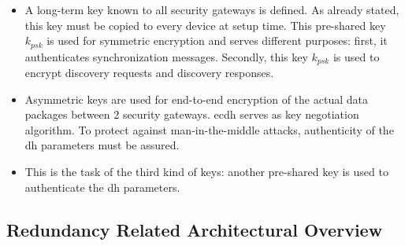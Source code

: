 \begin{itemize}
 \item A long-term key known to all security gateways is defined. As already stated, this key must be copied to every device at setup time. 
This pre-shared key $k_{psk}$ is used for symmetric encryption and serves different purposes: first, it authenticates synchronization messages.
Secondly, this key $k_{psk}$ is used to encrypt discovery requests and discovery responses.
 \item Asymmetric keys are used for end-to-end encryption of the actual data packages between 2 security gateways. \gls{ecdh} serves as key negotiation algorithm.
 To protect against man-in-the-middle attacks, authenticity of the \gls{dh} parameters must be assured.
 \item This is the task of the third kind of keys: another pre-shared key is used to authenticate the \gls{dh} parameters.
\end{itemize}


\subsection{Redundancy Related Architectural Overview}\label{ctrAvail}
 
